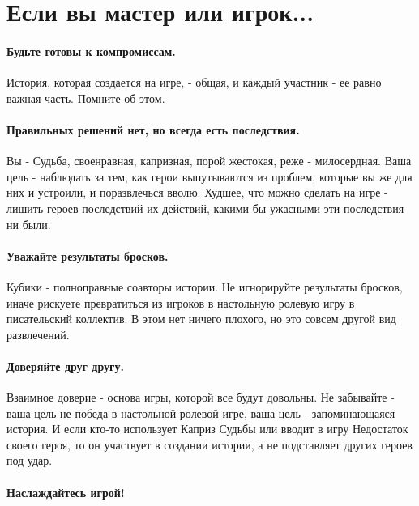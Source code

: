 \section*{Если вы мастер или игрок...}

\paragraph{Будьте готовы к компромиссам.} История, которая создается на игре, - общая, и каждый участник - ее равно важная часть. Помните об этом.
\paragraph{Правильных решений нет, но всегда есть последствия.} Вы - Судьба, своенравная, капризная, порой жестокая, реже - милосердная. Ваша цель - наблюдать за тем, как герои выпутываются из проблем, которые вы же для них и устроили, и поразвлечься вволю. Худшее, что можно сделать на игре - лишить героев последствий их действий, какими бы ужасными эти последствия ни были.
\paragraph{Уважайте результаты бросков.} Кубики - полноправные соавторы истории. Не игнорируйте результаты бросков, иначе рискуете превратиться из игроков в настольную ролевую игру в писательский коллектив. В этом нет ничего плохого, но это совсем другой вид развлечений.
\paragraph{Доверяйте друг другу.} Взаимное доверие - основа игры, которой все будут довольны. Не забывайте - ваша цель не победа в настольной ролевой игре, ваша цель - запоминающаяся история. И если кто-то использует Каприз Судьбы или вводит в игру Недостаток своего героя, то он участвует в создании истории, а не подставляет других героев под удар.
\paragraph{Наслаждайтесь игрой!}